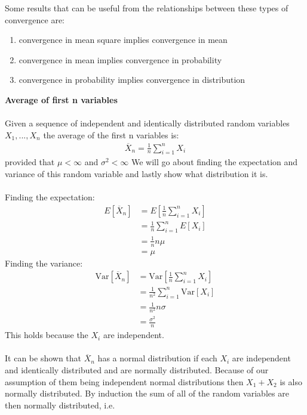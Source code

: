 \documentclass[,oneside]{article}
\begin{document}
\begin{enumerate}
Some results that can be useful from the relationships between these types of convergence are:
\begin{enumerate}
\item convergence in mean square implies convergence in mean
\item convergence in mean implies convergence in probability
\item convergence in probability implies convergence in distribution\\
\end{enumerate}
\textbf{Average of first n variables}\\ \\
Given a sequence of independent and identically distributed random variables $X_1,...,X_n$ the average of the first n variables is:
\begin{align*}
\overline{X}_n = \frac{1}{n} \sum_{i=1}^{n} X_i
\end{align*}
provided that $\mu < \infty$ and $\sigma^2 < \infty$ We will go about finding the expectation and variance of this random variable and lastly show what distribution it is.\\ \\
Finding the expectation:
\begin{align*}
E \left [ \overline{X}_n \right ] &= E \left [ \frac{1}{n} \sum_{i=1}^{n} X_i \right ]\\
&= \frac{1}{n} \sum_{i=1}^{n} E[X_i]\\
&=\frac{1}{n}n\mu\\ 
&=\mu
\end{align*}
Finding the variance:
\begin{align*}
\text{Var} \left [ \overline{X}_n \right ] &= \text{Var} \left [ \frac{1}{n} \sum_{i=1}^{n} X_i \right ]\\
&= \frac{1}{n^2} \sum_{i=1}^{n} \text{Var}[X_i]\\
&=\frac{1}{n^2}n\sigma\\ 
&=\frac{\sigma^2}{n}
\end{align*}
This holds because the $X_i$ are independent.\\ \\
It can be shown that $\overline{X}_n$ has a normal distribution if each $X_i$ are independent and identically distributed and are normally distributed. Because of our assumption of them being independent normal distributions then $X_1 + X_2$ is also normally distributed. By induction the sum of all of the random variables are then normally distributed, i.e.
\begin{align*}

\end{align*}
\end{enumerate}
\end{document}
